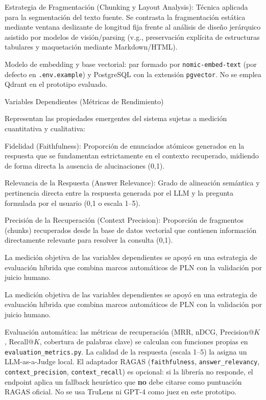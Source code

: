 Estrategia de Fragmentación (Chunking y Layout Analysis): Técnica aplicada para la segmentación del texto fuente. Se contrasta la fragmentación estática mediante ventana deslizante de longitud fija frente al análisis de diseño jerárquico asistido por modelos de visión/parsing (v.g., preservación explícita de estructuras tabulares y maquetación mediante Markdown/HTML).

Modelo de embedding y base vectorial: par formado por \texttt{nomic-embed-text} (por defecto en \texttt{.env.example}) y PostgreSQL con la extensión \texttt{pgvector}. No se emplea Qdrant en el prototipo evaluado.

Variables Dependientes (Métricas de Rendimiento)

Representan las propiedades emergentes del sistema sujetas a medición cuantitativa y cualitativa:

Fidelidad (Faithfulness): Proporción de enunciados atómicos generados en la respuesta que se fundamentan estrictamente en el contexto recuperado, midiendo de forma directa la ausencia de alucinaciones (0,1).

Relevancia de la Respuesta (Answer Relevance): Grado de alineación semántica y pertinencia directa entre la respuesta generada por el LLM y la pregunta formulada por el usuario (0,1 o escala 1--5).

Precisión de la Recuperación (Context Precision): Proporción de fragmentos (chunks) recuperados desde la base de datos vectorial que contienen información directamente relevante para resolver la consulta (0,1).

La medición objetiva de las variables dependientes se apoyó en una estrategia de evaluación híbrida que combina marcos automáticos de PLN con la validación por juicio humano.

La medición objetiva de las variables dependientes se apoyó en una estrategia de evaluación híbrida que combina marcos automáticos de PLN con la validación por juicio humano.

Evaluación automática: las métricas de recuperación (MRR, nDCG, Precision@$K$, Recall@$K$, cobertura de palabras clave) se calculan con funciones propias en \texttt{evaluation\_metrics.py}. La calidad de la respuesta (escala 1--5) la asigna un LLM-as-a-Judge local. El adaptador RAGAS (\texttt{faithfulness}, \texttt{answer\_relevancy}, \texttt{context\_precision}, \texttt{context\_recall}) es opcional: si la librería no responde, el endpoint aplica un fallback heurístico que \textbf{no} debe citarse como puntuación RAGAS oficial. No se usa TruLens ni GPT-4 como juez en este prototipo.


